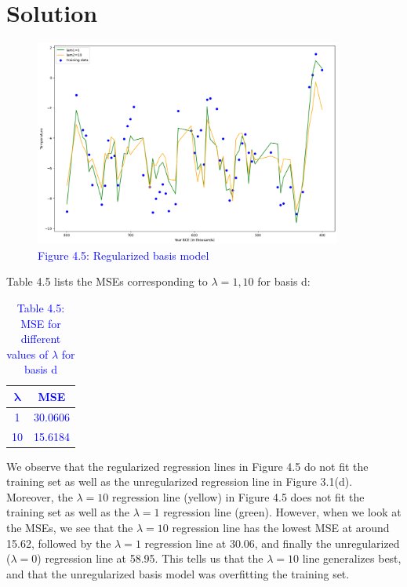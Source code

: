 \documentclass[submit]{../harvardml}
\newenvironment{solution}
  {\color{blue}\section*{Solution}}
{}
\begin{document}
\begin{solution}
\begin{enumerate}
    \begin{figure}[H]
        \centering
        \includegraphics[width=0.9\textwidth]{img_output/p4.5.png}
        \caption*{\textcolor{blue}{Figure 4.5: Regularized basis model}}
        \label{fig:q4.5}
    \end{figure}
    Table 4.5 lists the MSEs corresponding to $\lambda =1,10$ for basis d:
    \begin{table}[H]
        \centering
        \renewcommand{\arraystretch}{1.2} %
    
        \begin{tabular}{|c|c|}
            \hline
            \textbf{\textcolor{blue}{$\bm{\lambda}$}} & \textbf{\textcolor{blue}{MSE}} \\ 
            \hline
            \textcolor{blue}{1} & \textcolor{blue}{30.0606} \\ 
            \textcolor{blue}{10} & \textcolor{blue}{15.6184} \\ 
            \hline
        \end{tabular}
        
        \caption*{\textcolor{blue}{Table 4.5: MSE for different values of $\lambda$ for basis d}}
        \label{tab:mse_comparison}
    \end{table}
    We observe that the regularized regression lines in Figure 4.5 do not fit the training set as well as the unregularized regression line in Figure 3.1(d). Moreover, the $\lambda = 10$ regression line (yellow) in Figure 4.5 does not fit the training set as well as the $\lambda = 1$ regression line (green). However, when we look at the MSEs, we see that the $\lambda = 10$ regression line has the lowest MSE at around 15.62, followed by the $\lambda = 1$ regression line at 30.06, and finally the unregularized ($\lambda = 0$) regression line at 58.95. This tells us that the $\lambda = 10$ line generalizes best, and that the unregularized basis model was overfitting the training set.
    
\end{enumerate}

\end{solution}
\end{document}
